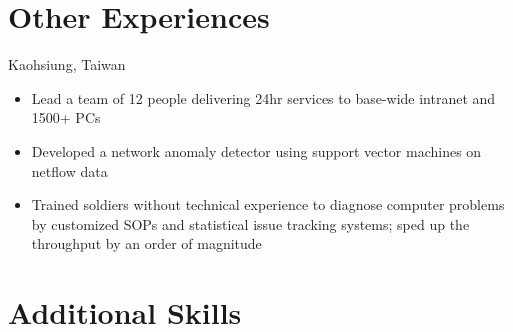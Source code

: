 \documentclass[11pt,letterpaper,sans]{moderncv}
\begin{document}
\section{Other Experiences}
	 {Kaohsiung, Taiwan}
	{
 		\begin{itemize}\parskip=0pt\vspace*{-3pt}
 			\item Lead a team of 12 people delivering 24hr services to base-wide intranet and 1500+ PCs
			\item Developed a network anomaly detector using support vector machines on netflow data
			\item Trained soldiers without technical experience to diagnose computer problems by customized SOPs and statistical issue tracking systems;
			sped up the throughput by an order of magnitude
 		\end{itemize}
	}
  \section{Additional Skills}
\end{document}
